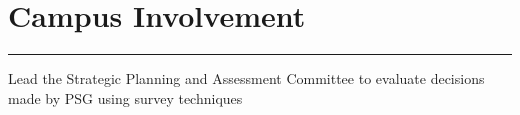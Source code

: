 \documentclass[]{sahana}
\begin{document}
\begin{minipage}[t]{0.66\textwidth}
\section{Campus Involvement}
\noindent\rule{12.5cm}{0.4pt}

\vspace{-8pt}
\begin{tightemize}
\item Lead the Strategic Planning and Assessment Committee to evaluate decisions made by PSG using survey techniques
\end{tightemize}
\vspace{1pt}



\end{minipage}
\end{document}
